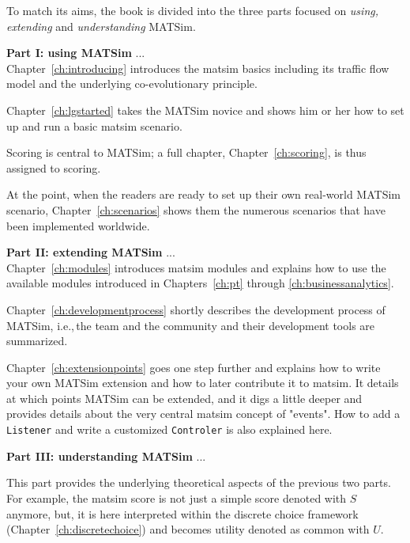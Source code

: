 To match its aims, the book is divided into the three parts focused on \emph{using, extending} and \emph{understanding} MATSim. 

\textbf{Part I: using MATSim} ... \\
Chapter~\ref{ch:introducing} introduces the \gls{matsim} basics including its traffic flow model and the underlying co-evolutionary principle. 

Chapter~\ref{ch:lgstarted} takes the MATSim novice and shows him or her how to set up and run a basic \gls{matsim} scenario. 

Scoring is central to MATSim; a full chapter, Chapter~\ref{ch:scoring}, is thus assigned to scoring. 

At the point, when the readers are ready to set up their own real-world MATSim \gls{scenario}, Chapter~\ref{ch:scenarios} shows them the numerous scenarios that have been implemented worldwide. 

\textbf{Part II: extending MATSim} ... \\
Chapter~\ref{ch:modules} introduces \gls{matsim} modules and explains how to use the available modules introduced in Chapters~\ref{ch:pt} through \ref{ch:businessanalytics}. 

Chapter~\ref{ch:developmentprocess} shortly describes the development process of MATSim, i.e.,\,the team and the community and their development tools are summarized. 

Chapter~\ref{ch:extensionpoints} goes one step further and explains how to write your own MATSim extension and how to later contribute it to \gls{matsim}. It details at which points MATSim can be extended, and it digs a little deeper and provides details about the very central \gls{matsim} concept of "events". How to add a \lstinline|Listener| and write a customized \lstinline|Controler| is also explained here.

\textbf{Part III: understanding MATSim} ... \\


This part provides the underlying theoretical aspects of the previous two parts. For example, the \gls{matsim} score is not just a simple score denoted with $S$ anymore, but, it is here interpreted within the discrete choice framework (Chapter~\ref{ch:discretechoice}) and becomes utility denoted as common with $U$. 

